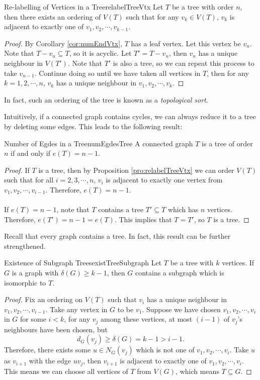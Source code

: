 \documentclass[math, code]{amznotes}
\theoremstyle{remark}
\begin{document}
\begin{probox}{Re-labelling of Vertices in a Tree}{relabelTreeVtx}
    Let $T$ be a tree with order $n$, then there exists an ordering of $V(T)$ such that for any $v_k \in V(T)$, $v_k$ is adjacent to exactly one of $v_1, v_2, \cdots, v_{k - 1}$.
    \tcblower
    \begin{proof}
        By Corollary \ref{cor:numEndVtx}, $T$ has a leaf vertex. Let this vertex be $v_n$. Note that $T - v_n \subseteq T$, so it is acyclic. Let $T' = T - v_n$, then $v_n$ has a unique neighbour in $V(T')$. Note that $T'$ is also a tree, so we can repeat this process to take $v_{n - 1}$. Continue doing so until we have taken all vertices in $T$, then for any $k = 1, 2, \cdots, n$, $v_k$ has a unique neighbour in $v_1, v_2, \cdots, v_k$.
    \end{proof}
\end{probox}
In fact, such an ordering of the tree is known as a \textit{topological sort}. 

Intuitively, if a connected graph contains cycles, we can always reduce it to a tree by deleting some edges. This leads to the following result:
\begin{corbox}{Number of Egdes in a Tree}{numEgdesTree}
    A connected graph $T$ is a tree of order $n$ if and only if $e(T) = n - 1$.
    \tcblower
    \begin{proof}
        If $T$ is a tree, then by Proposition \ref{pro:relabelTreeVtx} we can order $V(T)$ such that for all $i = 2, 3, \cdots, n$, $v_i$ is adjacent to exactly one vertex from $v_1, v_2, \cdots, v_{i - 1}$. Therefore, $e(T) = n - 1$.
        \\\\
        If $e(T) = n - 1$, note that $T$ contains a tree $T' \subseteq T$ which has $n$ vertices. Therefore, $e(T') = n - 1 = e(T)$. This implies that $T = T'$, so $T$ is a tree.
    \end{proof}
\end{corbox}
Recall that every graph contains a tree. In fact, this result can be further strengthened.
\begin{probox}{Existence of Subgraph Trees}{existTreeSubgraph}
    Let $T$ be a tree with $k$ vertices. If $G$ is a graph with $\delta(G) \geq k - 1$, then $G$ contains a subgraph which is isomorphic to $T$.
    \tcblower
    \begin{proof}
        Fix an ordering on $V(T)$ such that $v_i$ has a unique neighbour in $v_1, v_2, \cdots, v_{i - 1}$. Take any vertex in $G$ to be $v_1$. Suppose we have chosen $v_1, v_2, \cdots, v_i$ in $G$ for some $i < k$, for any $v_j$ among these vertices, at most $(i - 1)$ of $v_j$'s neighbours have been chosen, but
        \begin{equation*}
            d_G(v_j) \geq \delta(G) = k - 1 > i - 1.
        \end{equation*}
        Therefore, there exists some $u \in N_G(v_j)$ which is not one of $v_1, v_2, \cdots, v_i$. Take $u$ as $v_{i + 1}$ with the edge $uv_j$, then $v_{i + 1}$ is adjacent to exactly one of $v_1, v_2, \cdots, v_i$. This means we can choose all vertices of $T$ from $V(G)$, which means $T \subseteq G$.
    \end{proof}
\end{probox}
\end{document}
